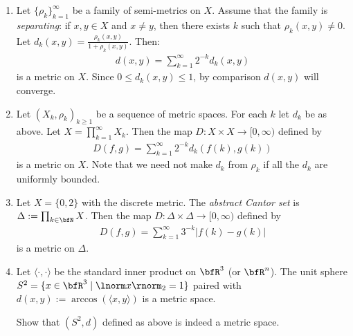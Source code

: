 \begin{example}
\begin{enumerate}[label = (\arabic*),itemsep=1pt,topsep=3pt]
            \item Let $\{\rho_k\}_{k = 1}^\infty$ be a family of semi-metrics on $X$. Assume that the family is \textit{separating}: if $x,y \in X$ and $x \neq y$, then there exists $k$ such that $\rho_k(x,y) \neq 0$. Let $d_k(x,y) = \frac{\rho_k(x,y)}{1 + \rho_k(x,y)}$. Then:
                \begin{equation*}
                \begin{split}
                    d(x,y) = \sum_{k = 1}^\infty 2^{-k}d_k(x,y)
                \end{split}
                \end{equation*}
            is a metric on $X$. Since $0 \leq d_k(x,y) \leq 1$, by comparison $d(x,y)$ will converge.

            \item Let $(X_k, \rho_k)_{k \geq 1}$ be a sequence of metric spaces. For each $k$ let $d_k$ be as above. Let $X = \prod_{k = 1}^\infty X_k$. Then the map $D:X \times X \rightarrow [0,\infty)$ defined by
                \begin{equation*}
                \begin{split}
                    D(f,g) = \sum_{k = 1}^\infty 2^{-k}d_k(f(k),g(k))
                \end{split}
                \end{equation*}
            is a metric on $X$. Note that we need not make $d_k$ from $\rho_k$ if all the $d_k$ are uniformly bounded.

            \item Let $X = \{0,2\}$ with the discrete metric. The \textit{abstract Cantor set} is $\Delta := \prod_{k \in \bfN}X$. Then the map $D:\Delta \times \Delta \rightarrow [0,\infty)$ defined by 
                \begin{equation*}
                \begin{split}
                    D(f,g) = \sum_{k = 1}^\infty 3^{-k}|f(k) - g(k)|
                \end{split}
                \end{equation*}
            is a metric on $\Delta$.

            \item Let $\langle \cdot,\cdot \rangle$ be the standard inner product on $\bfR^3$ (or $\bfR^n$). The unit sphere $S^2 = \{x \in \bfR^3 \mid \lnorm x \rnorm_2 = 1\}$ paired with $d(x,y):=\arccos(\langle x,y \rangle)$ is a metric space.
                \begin{exercise}
                    Show that $(S^2, d)$ defined as above is indeed a metric space.
                \end{exercise}
        \end{enumerate}
    \end{example}

